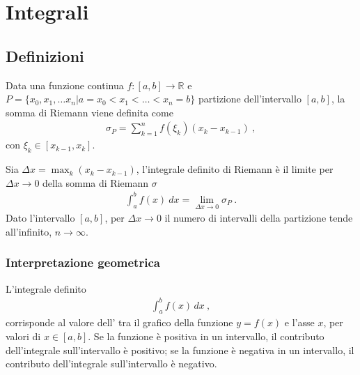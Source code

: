 \documentclass[letterpaper,10pt,english]{jupyterBook}
\begin{document}
\section{Integrali}
\label{\detokenize{ch/infinitesimal_calculus/integrals:integrali}}\label{\detokenize{ch/infinitesimal_calculus/integrals:infinitesimal-calculus-integrals}}\label{\detokenize{ch/infinitesimal_calculus/integrals::doc}}

\subsection{Definizioni}
\label{\detokenize{ch/infinitesimal_calculus/integrals:definizioni}}\label{\detokenize{ch/infinitesimal_calculus/integrals:infinitesimal-calculus-integrals-def}}
\sphinxAtStartPar
{} Data una funzione continua \(f: [a,b] \rightarrow \mathbb{R}\) e \(P = \{ x_0, x_1, \dots x_n | a = x_0 < x_1 < \dots < x_n = b \}\) partizione dell’intervallo \([a,b]\), la somma di Riemann viene definita come
\begin{equation}\label{equation:ch/infinitesimal_calculus/integrals:infinitesimal-calculus:integrals:riemann:sum}
\begin{split}\sigma_P = \sum_{k=1}^{n} f(\xi_k) (x_{k} - x_{k-1}) \ ,\end{split}
\end{equation}
\sphinxAtStartPar
con \(\xi_k \in [x_{k-1}, x_k]\).

\sphinxAtStartPar
{} Sia \(\Delta x = \max_k (x_{k} - x_{k-1})\), l’integrale definito di Riemann è  il limite per \(\Delta x \rightarrow 0\) della somma di Riemann \(\sigma\)
\begin{equation}\label{equation:ch/infinitesimal_calculus/integrals:infinitesimal-calculus:integrals:riemann:def}
\begin{split}\int_a^b f(x) \ dx = \lim_{\Delta x \rightarrow 0} \sigma_P \ .\end{split}
\end{equation}
\sphinxAtStartPar
{} Dato l’intervallo \([a,b]\), per \(\Delta x \rightarrow 0\) il numero di intervalli della partizione tende all’infinito, \(n \rightarrow \infty\).


\subsubsection{Interpretazione geometrica}
\label{\detokenize{ch/infinitesimal_calculus/integrals:interpretazione-geometrica}}
\sphinxAtStartPar
L’integrale definito
\begin{equation*}
\begin{split}\int_{a}^{b} f(x) \, dx \ ,\end{split}
\end{equation*}
\sphinxAtStartPar
corrisponde al valore dell’ tra il grafico della funzione \(y=f(x)\) e l’asse \(x\), per valori di \(x \in [a,b]\). Se la funzione è positiva in un intervallo, il contributo dell’integrale sull’intervallo è positivo; se la funzione è negativa in un intervallo, il contributo dell’integrale sull’intervallo è negativo.
\end{document}
